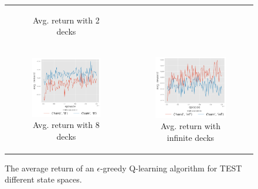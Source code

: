 \begin{figure}[htp]
\begin{tabular}{cc}
\begin{subfigure}[b]{0.48\textwidth}
   \caption{Avg. return with 2 decks\label{sfig:nd2}}
 \end{subfigure}
 \\
 \begin{subfigure}[b]{0.48\textwidth}
  	 \includegraphics[width=\textwidth]{./figures/avgReturnEp_ndeck8.png}
   \caption{Avg. return with 8 decks \label{sfig:nd8}}
 \end{subfigure}
 &
 \begin{subfigure}[b]{0.48\textwidth}
  	 \includegraphics[width=\textwidth]{./figures/avgReturnEp_ndeckinf.png}
   \caption{Avg. return with infinite decks \label{sfig:ndinf}}
 \end{subfigure}
\end{tabular}
\caption{The average return of an $\epsilon$-greedy Q-learning algorithm for TEST different state spaces. \label{fig:avg_return}}
\end{figure}

